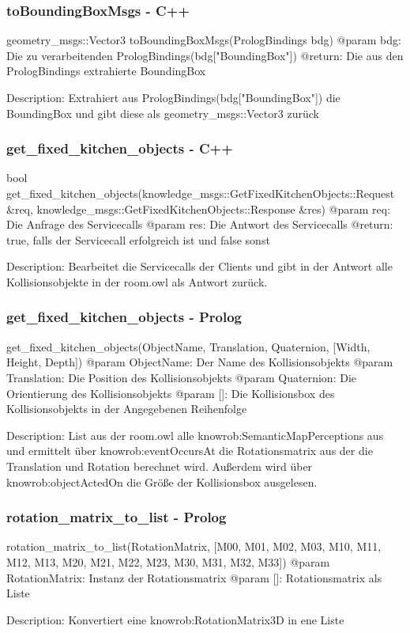 \documentclass{suturo}
\begin{document}
\subsubsection{toBoundingBoxMsgs - C++}
\begin{spverbatim}
geometry_msgs::Vector3 toBoundingBoxMsgs(PrologBindings bdg)
@param bdg: Die zu verarbeitenden PrologBindings(bdg["BoundingBox"])
@return: Die aus den PrologBindings extrahierte BoundingBox

Description: Extrahiert aus PrologBindings(bdg["BoundingBox"]) die BoundingBox und gibt diese als geometry_msgs::Vector3 zurück
\end{spverbatim}

\subsubsection{get\_fixed\_kitchen\_objects - C++}
\begin{spverbatim}
bool get_fixed_kitchen_objects(knowledge_msgs::GetFixedKitchenObjects::Request &req, knowledge_msgs::GetFixedKitchenObjects::Response &res)
@param req: Die Anfrage des Servicecalls
@param res: Die Antwort des Servicecalls
@return: true, falls der Servicecall erfolgreich ist und false sonst

Description: Bearbeitet die Servicecalls der Clients und gibt in der Antwort alle Kollisionsobjekte in der room.owl als Antwort zurück.
\end{spverbatim}

\subsubsection{get\_fixed\_kitchen\_objects - Prolog}
\begin{spverbatim}
get_fixed_kitchen_objects(ObjectName, Translation, Quaternion, [Width, Height, Depth])
@param ObjectName:  Der Name des Kollisionsobjekts
@param Translation: Die Position des Kollisionsobjekts
@param Quaternion:  Die Orientierung des Kollisionsobjekts
@param []:          Die Kollisionsbox des Kollisionsobjekts in der Angegebenen Reihenfolge

Description: List aus der room.owl alle knowrob:SemanticMapPerceptions aus und ermittelt über knowrob:eventOccursAt die Rotationsmatrix aus der die Translation und Rotation berechnet wird. Außerdem wird über knowrob:objectActedOn die Größe der Kollisionsbox ausgelesen.
\end{spverbatim}

\subsubsection{rotation\_matrix\_to\_list - Prolog}
\begin{spverbatim}
rotation_matrix_to_list(RotationMatrix, [M00, M01, M02, M03, M10, M11, M12, M13, M20, M21, M22, M23, M30, M31, M32, M33])
@param RotationMatrix: Instanz der Rotationsmatrix
@param []:             Rotationsmatrix als Liste

Description: Konvertiert eine knowrob:RotationMatrix3D in ene Liste
\end{spverbatim}
\end{document}
